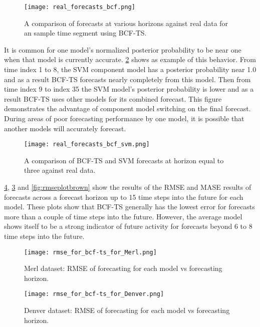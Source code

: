 \begin{figure}[h]
\centering
\texttt{[image: real\_forecasts\_bcf.png]}
\caption{A comparison of forecasts at various horizons against real data for an sample time segment using BCF-TS.}
\label{fig:realbcf}
\end{figure}

It is common for one model's normalized posterior probability to be near one when that model is currently accurate.  \ref{fig:realbcfsvm} shows as example of this behavior.  From time index 1 to 8, the SVM component model has a posterior probability near 1.0 and as a result BCF-TS forecasts nearly completely from this model.  Then from time index 9 to index 35 the SVM model's posterior probability is lower and as a result BCF-TS uses other models for its combined forecast.  This figure demonstrates the advantage of component model switching on the final forecast.  During areas of poor forecasting performance by one model, it is possible that another models will accurately forecast.

\begin{figure}[h]
\centering
\texttt{[image: real\_forecasts\_bcf\_svm.png]}
\caption{A comparison of BCF-TS and SVM forecasts at horizon equal to three against real data.}
\label{fig:realbcfsvm}
\end{figure}

\ref{fig:rmseplotdenver}, \ref{fig:rmseplotmerl} and \ref{fig:rmseplotbrown} show the results of the RMSE and MASE results of forecasts across a forecast horizon up to 15 time steps into the future for each model.  These plots show that BCF-TS generally has the lowest error for forecasts more than a couple of time steps into the future.  However, the average model shows itself to be a strong indicator of future activity for forecasts beyond 6 to 8 time steps into the future.

\begin{figure}[!ht]
	\begin{center}
		\texttt{[image: rmse\_for\_bcf-ts\_for\_Merl.png]}
	\end{center}
	\caption{Merl dataset: RMSE of forecasting for each model vs forecasting horizon.}
	\label{fig:rmseplotmerl}
\end{figure}

\begin{figure}[h]
	\begin{center}
		\texttt{[image: rmse\_for\_bcf-ts\_for\_Denver.png]}
	\end{center}
	\caption{Denver dataset: RMSE of forecasting for each model vs forecasting horizon.}
	\label{fig:rmseplotdenver}
\end{figure}

